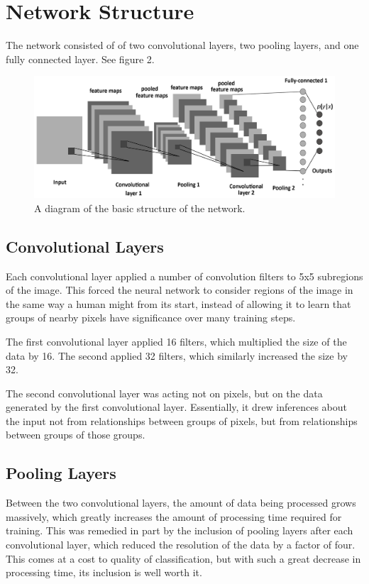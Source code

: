 \documentclass{article}
\begin{document}
\section{Network Structure}

The network consisted of of two convolutional layers, two pooling layers, and one fully connected layer. See figure 2.

\begin{figure}
  \centering
  	\includegraphics[width=0.8\linewidth]{figures/cnn}
  \caption{A diagram of the basic structure of the network.}
\end{figure}

\subsection{Convolutional Layers}

Each convolutional layer applied a number of convolution filters to 5x5 subregions of the image. This forced the neural network to consider regions of the image in the same way a human might from its start, instead of allowing it to learn that groups of nearby pixels have significance over many training steps.

The first convolutional layer applied 16 filters, which multiplied the size of the data by 16. The second applied 32 filters, which similarly increased the size by 32.

The second convolutional layer was acting not on pixels, but on the data generated by the first convolutional layer. Essentially, it drew inferences about the input not from relationships between groups of pixels, but from relationships between groups of those groups.

\subsection{Pooling Layers}

Between the two convolutional layers, the amount of data being processed grows massively, which greatly increases the amount of processing time required for training. This was remedied in part by the inclusion of pooling layers after each convolutional layer, which reduced the resolution of the data by a factor of four. This comes at a cost to quality of classification, but with such a great decrease in processing time, its inclusion is well worth it.
\end{document}
